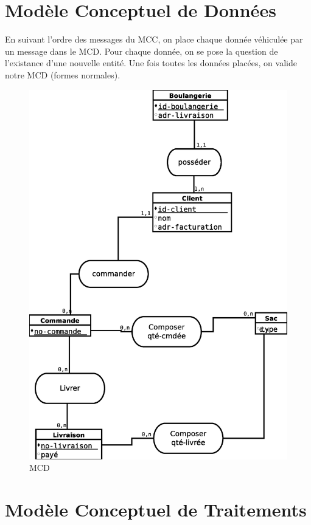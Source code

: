 \newpage
\section*{Modèle Conceptuel de Données}

En suivant l'ordre des messages du MCC, on place chaque donnée véhiculée par un message dans le MCD. Pour chaque donnée, on se pose la question de l'existance d'une nouvelle entité. Une fois toutes les données placées, on valide notre MCD (formes normales).

\begin{figure}[!htb]
    \begin{center}
    \includegraphics[width=11.5cm]{images/cc1_mcd.eps}
    \caption{\label{cc1_mcd} MCD}
    \end{center}
\end{figure}

\newpage
\section*{Modèle Conceptuel de Traitements}

